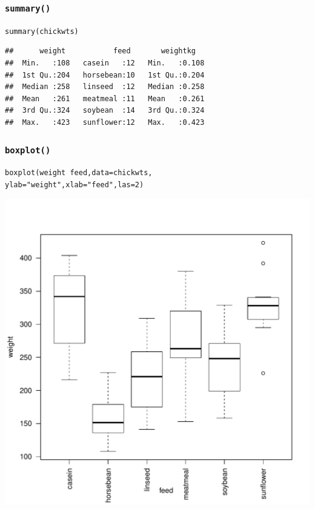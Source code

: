 \documentclass[extsize,handout,10pt]{beamer}\usepackage[]{graphicx}\usepackage[]{color}
\makeatletter
\newcommand{\hlnum}[1]{\textcolor[rgb]{0.502,0.086,1}{#1}}%
\newcommand{\hlstr}[1]{\textcolor[rgb]{1,0.4,0.2}{#1}}%
\newcommand{\hlopt}[1]{\textcolor[rgb]{0.251,0.251,0.251}{#1}}%
\newcommand{\hlstd}[1]{\textcolor[rgb]{0.251,0.251,0.251}{#1}}%
\newcommand{\hlkwc}[1]{\textcolor[rgb]{0.188,0.941,0.314}{#1}}%
\newcommand{\hlkwd}[1]{\textcolor[rgb]{0.69,0.188,0.941}{#1}}%
\newenvironment{kframe}{%
 \def\at@end@of@kframe{}%
 \ifinner\ifhmode%
  \def\at@end@of@kframe{\end{minipage}}%
  \begin{minipage}{\columnwidth}%
 \fi\fi%
 \def\FrameCommand##1{\hskip\@totalleftmargin \hskip-\fboxsep
 \colorbox{shadecolor}{##1}\hskip-\fboxsep
     \hskip-\linewidth \hskip-\@totalleftmargin \hskip\columnwidth}%
 \MakeFramed {\advance\hsize-\width
   \@totalleftmargin\z@ \linewidth\hsize
   \@setminipage}}%
 {\par\unskip\endMakeFramed%
 \at@end@of@kframe}
\newenvironment{knitrout}{}{} %
\makeatother
\begin{document}
\begin{frame}[containsverbatim]
  \frametitle{\texttt{summary()}}

\begin{knitrout}\tiny
{}\color{fgcolor}\begin{kframe}
\begin{alltt}
\hlkwd{summary}\hlstd{(chickwts)}
\end{alltt}
\begin{verbatim}
##      weight           feed       weightkg    
##  Min.   :108   casein   :12   Min.   :0.108  
##  1st Qu.:204   horsebean:10   1st Qu.:0.204  
##  Median :258   linseed  :12   Median :0.258  
##  Mean   :261   meatmeal :11   Mean   :0.261  
##  3rd Qu.:324   soybean  :14   3rd Qu.:0.324  
##  Max.   :423   sunflower:12   Max.   :0.423
\end{verbatim}
\end{kframe}
\end{knitrout}
\end{frame}



\begin{frame}[containsverbatim]
  \frametitle{\texttt{boxplot()}}
\begin{knitrout}\tiny
{}\color{fgcolor}\begin{kframe}
\begin{alltt}
\hlkwd{boxplot}\hlstd{(weight}\hlopt{~}\hlstd{feed,}\hlkwc{data}\hlstd{=chickwts,}
        \hlkwc{ylab}\hlstd{=}\hlstr{"weight"}\hlstd{,}\hlkwc{xlab}\hlstd{=}\hlstr{"feed"}\hlstd{,}\hlkwc{las}\hlstd{=}\hlnum{2}\hlstd{)}
\end{alltt}
\end{kframe}

{\centering \includegraphics[width=.49\linewidth]{figures/unnamed-chunk-14-1} 

}



\end{knitrout}
\end{frame}
\end{document}
